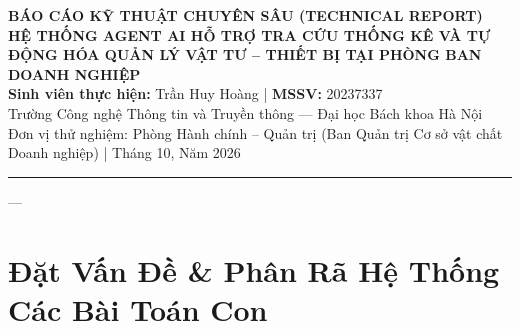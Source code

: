 \documentclass[11pt,a4paper]{article}
\begin{document}
\begin{center}
    {\Large\bfseries BÁO CÁO KỸ THUẬT CHUYÊN SÂU (TECHNICAL REPORT)}\\[0.3cm]
    {\LARGE\bfseries HỆ THỐNG AGENT AI HỖ TRỢ TRA CỨU THỐNG KÊ VÀ TỰ ĐỘNG HÓA QUẢN LÝ VẬT TƯ -- THIẾT BỊ TẠI PHÒNG BAN DOANH NGHIỆP}\\[0.4cm]
    {\normalsize\textbf{Sinh viên thực hiện:} Trần Huy Hoàng \quad | \quad \textbf{MSSV:} 20237337}\\[0.15cm]
    {\small Trường Công nghệ Thông tin và Truyền thông — Đại học Bách khoa Hà Nội}\\[0.15cm]
    {\small Đơn vị thử nghiệm: Phòng Hành chính -- Quản trị (Ban Quản trị Cơ sở vật chất Doanh nghiệp) \quad | \quad Tháng 10, Năm 2026}
\end{center}

\vspace{0.3cm}
\hrule height 1.2pt
\vspace{0.6cm}

\begin{abstract}
Báo cáo kỹ thuật trình bày phương pháp luận, kiến trúc đa tác tử (Multi-Agent System) và các giải pháp toán học nhằm tự động hóa nghiệp vụ quản lý tài sản, kiểm soát tồn kho và hỗ trợ kỹ thuật thiết bị tại phòng ban doanh nghiệp. Khác với các hệ thống chatbot truyền thống dựa trên sinh văn bản ngẫu nhiên, đề tài giải quyết triệt để bốn rào cản chí mạng khi ứng dụng Trí tuệ Nhân tạo tạo sinh vào sản xuất: (1) Ảo giác số học và sai số tính toán tồn kho; (2) Sự thất thường trong quyết định cấp phát dẫn tới hiệu ứng roi da (Bullwhip Effect); (3) Sự bế tắc của các công cụ OCR truyền thống khi xử lý hóa đơn giấy và bảng biểu phức tạp; và (4) Nguy cơ an toàn hệ thống khi tự động hóa thiếu kiểm soát. Bằng việc kết hợp kiến trúc đồ thị trạng thái có bộ nhớ (LangGraph), mô hình động học tồn kho có bộ nhớ hồi cứu kịch bản (AIM-RM), bộ phân tích thị giác độ phân giải động (Qwen2.5-VL), ma trận phân quyền vai trò NIST RBAC96 và cơ chế con người duyệt trước khi lưu (Human-in-the-Loop), hệ thống đạt độ chính xác tính toán số học 100\%, nhận diện chứng từ đạt trên 92\% và rút ngắn thời gian xử lý thủ tục hành chính từ 20 phút xuống dưới 10 giây.
\end{abstract}

---

\section{Đặt Vấn Đề \& Phân Rã Hệ Thống Các Bài Toán Con}
\end{document}
